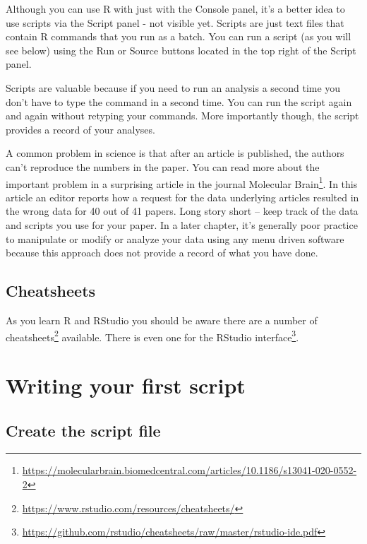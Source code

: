 \documentclass[
]{krantz}
\renewcommand{\href}[2]{#2\footnote{\url{#1}}}
\begin{document}
Although you can use R with just with the Console panel, it's a better idea to use scripts via the Script panel - not visible yet. Scripts are just text files that contain R commands that you run as a batch. You can run a script (as you will see below) using the Run or Source buttons located in the top right of the Script panel.

Scripts are valuable because if you need to run an analysis a second time you don't have to type the command in a second time. You can run the script again and again without retyping your commands. More importantly though, the script provides a record of your analyses.

A common problem in science is that after an article is published, the authors can't reproduce the numbers in the paper. You can read more about the important problem in a surprising article in the journal \href{https://molecularbrain.biomedcentral.com/articles/10.1186/s13041-020-0552-2}{Molecular Brain}. In this article an editor reports how a request for the data underlying articles resulted in the wrong data for 40 out of 41 papers. Long story short -- keep track of the data and scripts you use for your paper. In a later chapter, it's generally poor practice to manipulate or modify or analyze your data using any menu driven software because this approach does not provide a record of what you have done.

\hypertarget{cheatsheets}{%
\subsection{Cheatsheets}\label{cheatsheets}}

As you learn R and RStudio you should be aware there are a number of \href{https://www.rstudio.com/resources/cheatsheets/}{cheatsheets} available. There is even one for the \href{https://github.com/rstudio/cheatsheets/raw/master/rstudio-ide.pdf}{RStudio interface}.

\hypertarget{writing-your-first-script}{%
\section{Writing your first script}\label{writing-your-first-script}}

\hypertarget{create-the-script-file}{%
\subsection{Create the script file}\label{create-the-script-file}}
\end{document}
